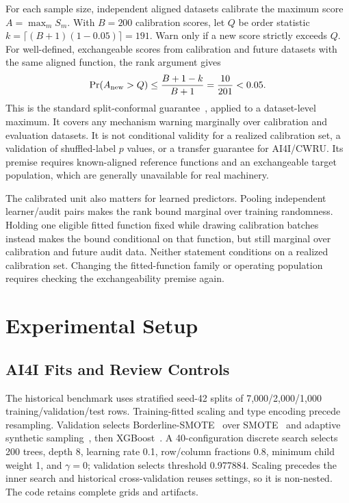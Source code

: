 \documentclass[conference]{IEEEtran}
\begin{document}
For each sample size, independent aligned datasets calibrate the maximum score $A=\max_m S_m$. With $B=200$ calibration scores, let $Q$ be order statistic $k=\lceil(B+1)(1-0.05)\rceil=191$. Warn only if a new score strictly exceeds $Q$. For well-defined, exchangeable scores from calibration and future datasets with the same aligned function, the rank argument gives
\begin{equation}
 \Pr(A_{\rm new}>Q)\leq\frac{B+1-k}{B+1}=\frac{10}{201}<0.05.
\end{equation}
This is the standard split-conformal guarantee~\cite{angelopoulos2023conformal}, applied to a dataset-level maximum. It covers any mechanism warning marginally over calibration and evaluation datasets. It is not conditional validity for a realized calibration set, a validation of shuffled-label $p$ values, or a transfer guarantee for AI4I/CWRU. Its premise requires known-aligned reference functions and an exchangeable target population, which are generally unavailable for real machinery.

The calibrated unit also matters for learned predictors. Pooling independent learner/audit pairs makes the rank bound marginal over training randomness. Holding one eligible fitted function fixed while drawing calibration batches instead makes the bound conditional on that function, but still marginal over calibration and future audit data. Neither statement conditions on a realized calibration set. Changing the fitted-function family or operating population requires checking the exchangeability premise again.

\section{Experimental Setup}
\label{sec:setup}
\subsection{AI4I Fits and Review Controls}
The historical benchmark uses stratified seed-42 splits of 7{,}000/2{,}000/1{,}000 training/validation/test rows. Training-fitted scaling and type encoding precede resampling. Validation selects Borderline-SMOTE~\cite{han2005borderline} over SMOTE~\cite{chawla2002smote} and adaptive synthetic sampling~\cite{he2008adasyn}, then XGBoost~\cite{chen2016xgboost}. A 40-configuration discrete search selects 200 trees, depth 8, learning rate 0.1, row/column fractions 0.8, minimum child weight 1, and $\gamma=0$; validation selects threshold 0.977884. Scaling precedes the inner search and historical cross-validation reuses settings, so it is non-nested. The code retains complete grids and artifacts.
\end{document}
